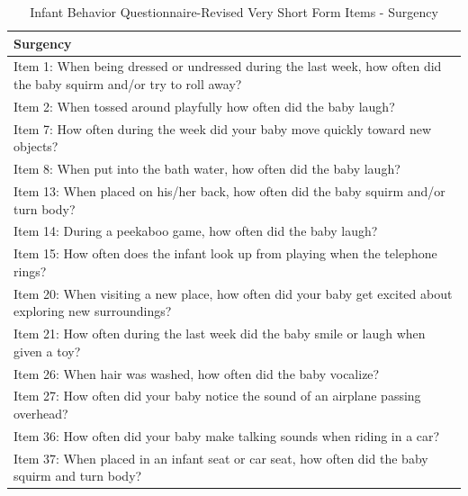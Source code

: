 \documentclass[
]{article}
\begin{document}
\pagebreak
\begin{table}

\caption{\label{tab:unnamed-chunk-3}Infant Behavior Questionnaire-Revised Very Short Form Items - Surgency}
\fontsize{12}{14}\selectfont
\begin{tabular}[t]{>{\raggedright\arraybackslash}p{40em}}
\hline
\textbf{Surgency}\\
\hline
Item 1: When being dressed or undressed during the last week, how often did the baby squirm and/or try to roll away?\\
\hline
Item 2: When tossed around playfully how often did the baby laugh?\\
\hline
Item 7: How often during the week did your baby move quickly toward new objects?\\
\hline
Item 8: When put into the bath water, how often did the baby laugh?\\
\hline
Item 13: When placed on his/her back, how often did the baby squirm and/or turn body?\\
\hline
Item 14: During a peekaboo game, how often did the baby laugh?\\
\hline
Item 15: How often does the infant look up from playing when the telephone rings?\\
\hline
Item 20: When visiting a new place, how often did your baby get excited about exploring new surroundings?\\
\hline
Item 21: How often during the last week did the baby smile or laugh when given a toy?\\
\hline
Item 26: When hair was washed, how often did the baby vocalize?\\
\hline
Item 27: How often did your baby notice the sound of an airplane passing overhead?\\
\hline
Item 36: How often did your baby make talking sounds when riding in a car?\\
\hline
Item 37: When placed in an infant seat or car seat, how often did the baby squirm and turn body?\\
\hline
\end{tabular}
\end{table}

\hypertarget{section-1}{%
\section{}\label{section-1}}

\pagebreak
\end{document}
